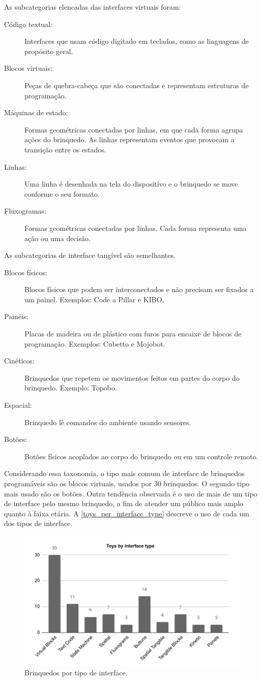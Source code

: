 {As subcategorias elencadas das interfaces virtuais foram:
\begin{description}
    \item[Código textual: ] Interfaces que usam código digitado em teclados, como as linguagens de propósito geral.
    \item[Blocos virtuais: ] Peças de quebra-cabeça que são conectadas e representam estruturas de programação.
    \item[Máquinas de estado: ] Formas geométricas conectadas por linhas, em que cada forma agrupa ações do brinquedo. As linhas representam eventos que provocam a transição entre os estados.
    \item[Linhas: ] Uma linha é desenhada na tela do dispositivo e o brinquedo se move conforme o seu formato.
    \item[Fluxogramas: ] Formas geométricas conectadas por linhas. Cada forma representa uma ação ou uma decisão.
\end{description}

As subcategorias de interface tangível são semelhantes.

\begin{description}
    \item[Blocos físicos: ] Blocos físicos que podem ser interconectados e não precisam ser fixados a um painel. Exemplos: Code a Pillar e KIBO.
    \item[Painéis: ] Placas de madeira ou de plástico com furos para encaixe de blocos de programação. Exemplos: Cubetto e Mojobot.
    \item[Cinéticos: ] Brinquedos que repetem os movimentos feitos em partes do corpo do brinquedo. Exemplo: Topobo.
    \item[Espacial: ] Brinquedo lê comandos do ambiente usando sensores.
    \item[Botões: ] Botões físicos acoplados ao corpo do brinquedo ou em um controle remoto.
\end{description}

Considerando essa taxonomia, o tipo mais comum de interface de brinquedos programáveis são os blocos virtuais, usados por 30 brinquedos. O segundo tipo mais usado são os botões. Outra tendência observada é o uso de mais de um tipo de interface pelo mesmo brinquedo, a fim de atender um público mais amplo quanto à faixa etária. A \autoref{toys_per_interface_type} descreve o uso de cada um dos tipos de interface.

\begin{figure}[!htbp]
    \centering
    \includegraphics[width=.6\linewidth,fbox]{figs/toys_per_interface_type.png}
    \caption{Brinquedos por tipo de interface.}
    \label{toys_per_interface_type}
    \sourceauthor
\end{figure}

}
